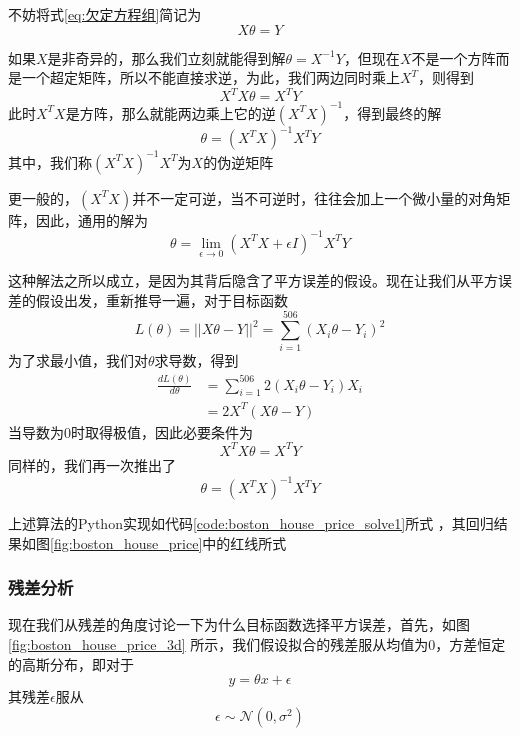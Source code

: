 不妨将式\ref{eq:欠定方程组}简记为
\begin{equation}
	X\theta = Y
\end{equation}

如果$X$是非奇异的，那么我们立刻就能得到解$\theta = X^{-1}Y$，但现在$X$不是一个方阵而是一个超定矩阵，所以不能直接求逆，为此，我们两边同时乘上$X^T$，则得到
\begin{equation}
	X^TX\theta = X^TY
\end{equation}
此时$X^TX$是方阵，那么就能两边乘上它的逆$(X^TX)^{-1}$，得到最终的解
\begin{equation}
	\theta = (X^TX)^{-1}X^TY
\end{equation}
其中，我们称$(X^TX)^{-1}X^T$为$X$的伪逆矩阵

更一般的，$(X^TX)$并不一定可逆，当不可逆时，往往会加上一个微小量的对角矩阵，因此，通用的解为
\begin{equation}\label{equ:linear_regress_approx_solve}
	\theta = \lim_{\epsilon\rightarrow 0}(X^TX + \epsilon I)^{-1}X^TY
\end{equation}


这种解法之所以成立，是因为其背后隐含了平方误差的假设。现在让我们从平方误差的假设出发，重新推导一遍，对于目标函数
\begin{equation}
	L(\theta) = || X\theta - Y||^2 = \sum_{i=1}^{506}(X_i\theta - Y_i)^2
\end{equation}
为了求最小值，我们对$\theta$求导数，得到
\begin{equation}
	\begin{split}
	\frac{d L(\theta)}{d \theta} &= \sum_{i=1}^{506}2(X_i\theta - Y_i)X_i\\
	&= 2X^T(X\theta - Y)
	\end{split}
\end{equation}
当导数为0时取得极值，因此必要条件为
\begin{equation}
X^TX\theta = X^TY
\end{equation}
同样的，我们再一次推出了
\begin{equation}
	\theta = (X^TX)^{-1}X^TY
\end{equation}

上述算法的Python实现如代码\ref{code:boston_house_price_solve1}所式	，其回归结果如图\ref{fig:boston_house_price}中的红线所式



\subsubsection{残差分析} %
\label{ssub:残差分析}
现在我们从残差的角度讨论一下为什么目标函数选择平方误差，首先，如图\ref{fig:boston_house_price_3d} 所示，我们假设拟合的残差服从均值为0，方差恒定的高斯分布，即对于
\begin{equation}
	y = \theta x + \epsilon
\end{equation}
其残差$\epsilon$服从
\begin{equation}
\epsilon \sim \mathcal{N}(0, \sigma^2)
\end{equation}

